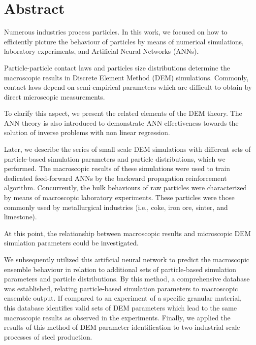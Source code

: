 \chapter*{Abstract}
\label{cap:abstract}

Numerous industries process particles.
In this work, we focused on how to efficiently picture the behaviour of
particles by means of numerical simulations, laboratory experiments, 
and Artificial Neural Networks (ANNs).

Particle-particle contact laws and particles size distributions determine the
macroscopic results in Discrete Element Method (DEM) simulations. 
Commonly, contact laws depend on semi-empirical parameters which 
are difficult to obtain by direct microscopic measurements. 

To clarify this aspect, we present the related elements of the DEM
theory.
The ANN theory is also introduced to demonstrate ANN effectiveness towards
the solution of inverse problems with non linear regression.

Later, we describe the series of small scale DEM simulations with different sets
of particle-based simulation parameters and particle distributions, which we
performed.
The macroscopic results of these simulations were used to train dedicated
feed-forward ANNs by the backward propagation reinforcement algorithm.
Concurrently, the bulk behaviours of raw particles were characterized by means
of macroscopic laboratory experiments. These particles were those commonly used
by metallurgical industries (i.e., coke, iron ore, sinter, and limestone).

At this point, the relationship between macroscopic results and microscopic DEM
simulation parameters could be investigated.

We subsequently utilized this artificial neural network to predict the
macroscopic ensemble behaviour in relation to additional sets of particle-based simulation parameters and particle distributions. 
By this method, a comprehensive database was established, relating particle-based 
simulation parameters to macroscopic ensemble output.
If compared to an experiment of a specific granular material, this database identifies 
valid sets of DEM parameters which lead to the same macroscopic results as observed in the experiments.
Finally, we applied the results of this method of DEM parameter identification
to two industrial scale processes of steel production.
